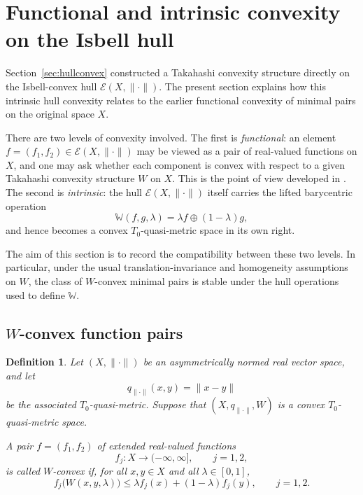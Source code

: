 \documentclass[preprint,12pt]{elsarticle}
\numberwithin{equation}{section}
\newtheorem{definition}[theorem]{Definition}
\newcommand{\E}{\mathcal{E}}
\begin{document}
\section{Functional and intrinsic convexity on the Isbell hull}
\label{sec:pairconvex}

Section~\ref{sec:hullconvex} constructed a Takahashi convexity structure
directly on the Isbell-convex hull \(\E(X,\|\cdot\|)\).  The present section
explains how this intrinsic hull convexity relates to the earlier functional
convexity of minimal pairs on the original space \(X\).

There are two levels of convexity involved.  The first is \emph{functional}:
an element \(f=(f_1,f_2)\in\E(X,\|\cdot\|)\) may be viewed as a pair of
real-valued functions on \(X\), and one may ask whether each component is
convex with respect to a given Takahashi convexity structure \(W\) on \(X\).
This is the point of view developed in \cite{OlelaZweni2023}.  The second is
\emph{intrinsic}: the hull \(\E(X,\|\cdot\|)\) itself carries the lifted
barycentric operation
\[
\mathbb W(f,g,\lambda)=\lambda f\oplus(1-\lambda)g,
\]
and hence becomes a convex \(T_0\)-quasi-metric space in its own right.

The aim of this section is to record the compatibility between these two
levels.  In particular, under the usual translation-invariance and homogeneity
assumptions on \(W\), the class of \(W\)-convex minimal pairs is stable under
the hull operations used to define \(\mathbb W\).

\subsection{\texorpdfstring{\(W\)}{W}-convex function pairs}

\begin{definition}\label{def:Wconvexpair}
Let \((X,\|\cdot\|)\) be an asymmetrically normed real vector space, and let
\[
q_{\|\cdot\|}(x,y)=\|x-y\|
\]
be the associated \(T_0\)-quasi-metric.  Suppose that
\((X,q_{\|\cdot\|},W)\) is a convex \(T_0\)-quasi-metric space.

A pair \(f=(f_1,f_2)\) of extended real-valued functions
\[
f_j:X\longrightarrow (-\infty,\infty],
\qquad j=1,2,
\]
is called \emph{\(W\)-convex} if, for all \(x,y\in X\) and all
\(\lambda\in[0,1]\),
\[
f_j\bigl(W(x,y,\lambda)\bigr)
\le
\lambda f_j(x)+(1-\lambda)f_j(y),
\qquad j=1,2.
\]
\end{definition}
\end{document}
